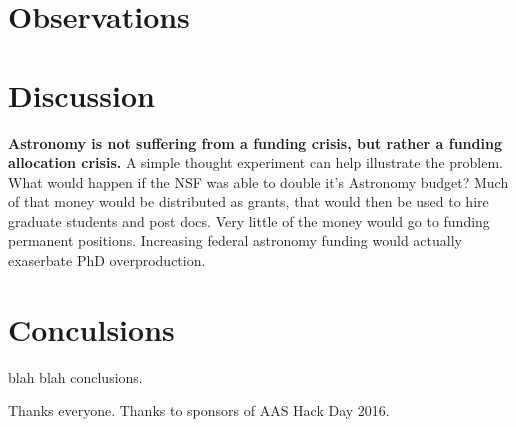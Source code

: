 \documentclass{emulateapj}
\begin{document}
\section{Observations}

\section{Discussion}

{\bf{Astronomy is not suffering from a funding crisis, but rather a funding allocation crisis.}} A simple thought experiment can help illustrate the problem. What would happen if the NSF was able to double it's Astronomy budget? Much of that money would be distributed as grants, that would then be used to hire graduate students and post docs. Very little of the money would go to funding permanent positions. Increasing federal astronomy funding would actually exaserbate PhD overproduction. 







\section{Conculsions}
blah blah conclusions.


\acknowledgments
Thanks everyone. Thanks to sponsors of AAS Hack Day 2016. 



\end{document}
